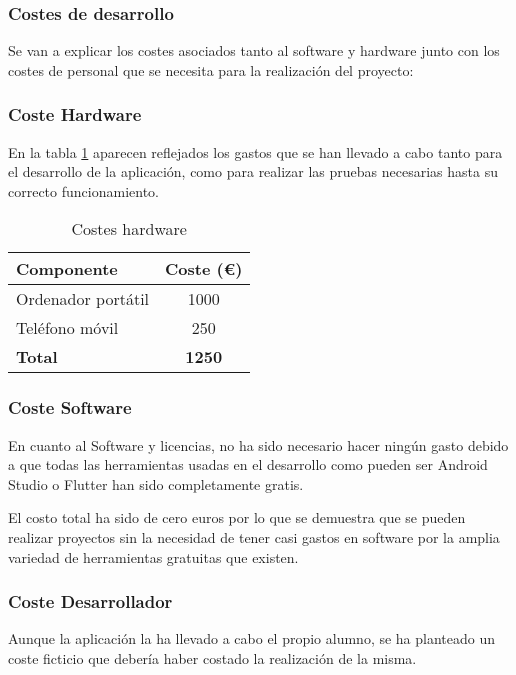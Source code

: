 \subsubsection{Costes de desarrollo}

Se van a explicar los costes asociados tanto al software y hardware junto con los costes de personal que se necesita para la realización del proyecto:

\subsubsection{Coste Hardware}
En la tabla \ref{tab:CostosHardware} aparecen reflejados los gastos que se han llevado a cabo tanto para el desarrollo de la aplicación, como para realizar las pruebas necesarias hasta su correcto funcionamiento.

\begin{table}[H]
\centering
\begin{tabular}{|l|c|}
\hline
\textbf{Componente} & \textbf{Coste (€)} \\ \hline
Ordenador portátil & 1000 \\ \hline
Teléfono móvil & 250 \\ \hline
\textbf{Total} & \textbf{1250} \\ \hline
\end{tabular}
\caption{Costes hardware}
\label{tab:CostosHardware}
\end{table}

\subsubsection{Coste Software}
En cuanto al Software y licencias, no ha sido necesario hacer ningún gasto debido a que todas las herramientas usadas en el desarrollo como pueden ser Android Studio o Flutter han sido completamente gratis.

El costo total ha sido de cero euros por lo que se demuestra que se pueden realizar proyectos sin la necesidad de tener casi gastos en software por la amplia variedad de herramientas gratuitas que existen.


\subsubsection{Coste Desarrollador}
Aunque la aplicación la ha llevado a cabo el propio alumno, se ha planteado un coste ficticio que debería haber costado la realización de la misma.

